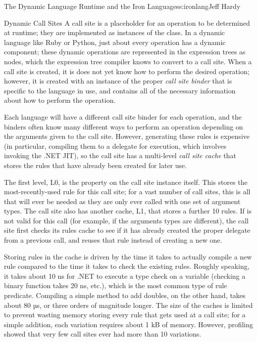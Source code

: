 \begin{aosachapter}{The Dynamic Language Runtime and the Iron Languages}{s:ironlang}{Jeff Hardy}
\begin{aosasect1}{Dynamic Call Sites}
A call site is a placeholder for an operation to be determined at
runtime; they are implemented as instances of the
 class. In a dynamic
language like Ruby or Python, just about every operation has a dynamic
component; these dynamic operations are represented in the expression
trees as  nodes, which the expression tree
compiler knows to convert to a call site. When a call site is created,
it is does not yet know how to perform the desired operation; however,
it is created with an instance of the proper \emph{call site binder}
that is specific to the language in use, and contains all of the
necessary information about how to perform the operation.


Each language will have a different call site binder for each
operation, and the binders often know many different ways to perform
an operation depending on the arguments given to the call
site. However, generating these rules is expensive (in particular,
compiling them to a delegate for execution, which involves invoking
the .NET JIT), so the call site has a multi-level \emph{call site
  cache} that stores the rules that have already been created for
later use.


The first level, L0, is the  property on the
call site instance itself. This stores the most-recently-used rule for
this call site; for a vast number of call sites, this is all that will
ever be needed as they are only ever called with one set of argument
types. The call site also has another cache, L1, that stores a further
10 rules. If  is not valid for this call (for example, if
the arguments types are different), the call site first checks its
rules cache to see if it has already created the proper delegate from
a previous call, and reuses that rule instead of creating a new one.

Storing rules in the cache is driven by the time it takes to actually
compile a new rule compared to the time it takes to check the existing
rules. Roughly speaking, it takes about 10 ns for .NET to execute a
type check on a variable (checking a binary function takes 20 ns,
etc.), which is the most common type of rule predicate. Compiling a
simple method to add doubles, on the other hand, takes about 80 µs, or
three orders of magnitude longer. The size of the caches is limited to
prevent wasting memory storing every rule that gets used at a call
site; for a simple addition, each variation requires about 1 kB of
memory. However, profiling showed that very few call sites ever had
more than 10 variations.


\end{aosasect1}
\end{aosachapter}
